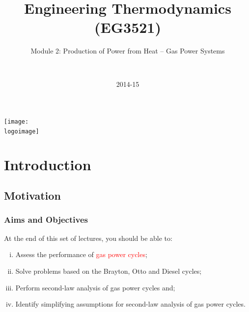 \documentclass[10pt,compress]{beamer}
\institute{School of Engineering}
\title{Engineering Thermodynamics (EG3521)}
\subtitle{Module 2: Production of Power from Heat -- Gas Power Systems}
\date[2014-15]{2014-15}
\author[\shortname]{%
  \fullname\\\ttfamily{\emailaddress}
}
\newcommand{\logoimage}{../FigBanner/UoAHorizBanner}
\newcommand{\red}{\textcolor{red}}
\begin{document}
\begin{frame}
  \titlepage
  \vfill%
  \begin{center}
    \texttt{[image: \\logoimage]}
  \end{center}
\end{frame}




\section{Introduction}

\subsection{Motivation}
\begin{frame}
 \frametitle{Aims and Objectives}
 At the end of this set of lectures, you should be able to:
 \begin{enumerate}[(i)]
  \item <1-> Assess the performance of \red{gas power cycles};
  \item <2-> Solve problems based on the Brayton, Otto and Diesel cycles;
  \item <3-> Perform second-law analysis of gas power cycles and;
  \item <4-> Identify simplifying assumptions for second-law analysis of gas power cycles.
 \end{enumerate}
\end{frame}

\end{document}
